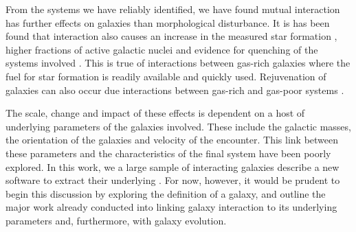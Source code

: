 From the systems we have reliably identified, we have found mutual interaction has further effects on galaxies than morphological disturbance. It is has been found that interaction also causes an increase in the measured star formation \citep{1987ApJ...320...49B, 1992ApJ...400..153M}, higher fractions of active galactic nuclei \citep{2008AJ....135.1877E, 2014MNRAS.441.1297S} and evidence for quenching of the systems involved \citep{1992AJ....104.1039S, 2010MNRAS.407..749G}. This is \DIFdelbegin {}\DIFdelend \DIFaddbegin {}\DIFaddend true of interactions between gas-rich galaxies where the fuel for star formation is readily available and quickly used. Rejuvenation of galaxies can also occur due interactions between gas-rich and gas-poor systems \citep{1992AJ....104.1039S, 2009ApJ...691.1168H}.

The scale, change and impact of these effects is dependent on a host of underlying parameters of the galaxies involved. These include the galactic masses, the orientation of the galaxies and velocity of the encounter. This link between these parameters and the characteristics of the final system have been poorly explored. In this work, we \DIFdelbegin {}\DIFdelend \DIFaddbegin {}\DIFaddend a large sample of interacting galaxies \DIFdelbegin {}\DIFdelend \DIFaddbegin {}\texttt{} \DIFaddend describe a new software to extract their underlying \DIFdelbegin {}\DIFdelend \DIFaddbegin {}\DIFaddend . For now, however, it would be prudent to begin this discussion by exploring the definition of a galaxy, and outline the major work already conducted into linking galaxy interaction to its underlying parameters and, furthermore, with galaxy evolution.

